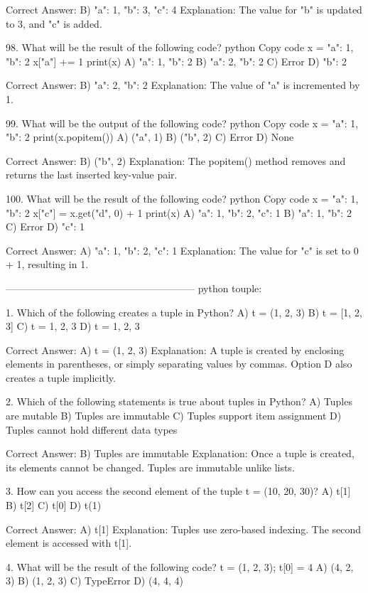 Correct Answer: B) {"a": 1, "b": 3, "c": 4}
Explanation: The value for "b" is updated to 3, and "c" is added.

98. What will be the result of the following code?
python
Copy code
x = {"a": 1, "b": 2}
x["a"] += 1
print(x)
A) {"a": 1, "b": 2}
B) {"a": 2, "b": 2}
C) Error
D) {"b": 2}

Correct Answer: B) {"a": 2, "b": 2}
Explanation: The value of "a" is incremented by 1.

99. What will be the output of the following code?
python
Copy code
x = {"a": 1, "b": 2}
print(x.popitem())
A) ("a", 1)
B) ("b", 2)
C) Error
D) None

Correct Answer: B) ("b", 2)
Explanation: The popitem() method removes and returns the last inserted key-value pair.

100. What will be the result of the following code?
python
Copy code
x = {"a": 1, "b": 2}
x["c"] = x.get("d", 0) + 1
print(x)
A) {"a": 1, "b": 2, "c": 1}
B) {"a": 1, "b": 2}
C) Error
D) {"c": 1}

Correct Answer: A) {"a": 1, "b": 2, "c": 1}
Explanation: The value for "c" is set to 0 + 1, resulting in 1.

---------------------------------------------------------
python touple:

1. Which of the following creates a tuple in Python?
A) t = (1, 2, 3)
B) t = [1, 2, 3]
C) t = {1, 2, 3}
D) t = 1, 2, 3

Correct Answer: A) t = (1, 2, 3)
Explanation: A tuple is created by enclosing elements in parentheses, or simply separating values by commas. Option D also creates a tuple implicitly.

2. Which of the following statements is true about tuples in Python?
A) Tuples are mutable
B) Tuples are immutable
C) Tuples support item assignment
D) Tuples cannot hold different data types

Correct Answer: B) Tuples are immutable
Explanation: Once a tuple is created, its elements cannot be changed. Tuples are immutable unlike lists.

3. How can you access the second element of the tuple t = (10, 20, 30)?
A) t[1]
B) t[2]
C) t[0]
D) t(1)

Correct Answer: A) t[1]
Explanation: Tuples use zero-based indexing. The second element is accessed with t[1].

4. What will be the result of the following code? t = (1, 2, 3); t[0] = 4
A) (4, 2, 3)
B) (1, 2, 3)
C) TypeError
D) (4, 4, 4)

